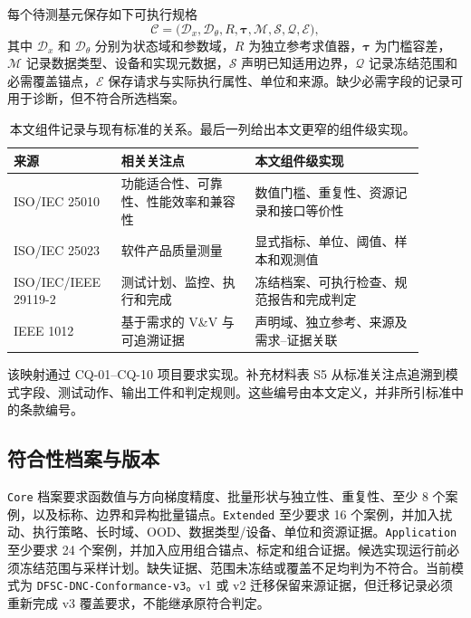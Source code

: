 \documentclass[preprint,12pt,authoryear]{elsarticle}
\begin{document}
每个待测基元保存如下可执行规格
\begin{equation}
 \mathcal{C}=\bigl(\mathcal{D}_{x},\mathcal{D}_{\theta},R,
 \boldsymbol{\tau},\mathcal{M},\mathcal{S},\mathcal{Q},\mathcal{E}\bigr),
\end{equation}
其中 $\mathcal{D}_{x}$ 和 $\mathcal{D}_{\theta}$ 分别为状态域和参数域，$R$ 为独立参考求值器，$\boldsymbol{\tau}$ 为门槛容差，$\mathcal{M}$ 记录数据类型、设备和实现元数据，$\mathcal{S}$ 声明已知适用边界，$\mathcal{Q}$ 记录冻结范围和必需覆盖锚点，$\mathcal{E}$ 保存请求与实际执行属性、单位和来源。缺少必需字段的记录可用于诊断，但不符合所选档案。

\begin{table}[t]
\centering
\small
\setlength{\tabcolsep}{4pt}
\caption{本文组件记录与现有标准的关系。最后一列给出本文更窄的组件级实现。}
\label{tab:standards-map-zh}
\begin{tabular}{>{\raggedright\arraybackslash}p{0.22\linewidth}>{\raggedright\arraybackslash}p{0.30\linewidth}>{\raggedright\arraybackslash}p{0.38\linewidth}}
\toprule
来源 & 相关关注点 & 本文组件级实现\\
\midrule
ISO/IEC 25010 & 功能适合性、可靠性、性能效率和兼容性 & 数值门槛、重复性、资源记录和接口等价性\\
ISO/IEC 25023 & 软件产品质量测量 & 显式指标、单位、阈值、样本和观测值\\
ISO/IEC/IEEE 29119-2 & 测试计划、监控、执行和完成 & 冻结档案、可执行检查、规范报告和完成判定\\
IEEE 1012 & 基于需求的 V\&V 与可追溯证据 & 声明域、独立参考、来源及需求--证据关联\\
\bottomrule
\end{tabular}
\end{table}

该映射通过 CQ-01--CQ-10 项目要求实现。补充材料表 S5 从标准关注点追溯到模式字段、测试动作、输出工件和判定规则。这些编号由本文定义，并非所引标准中的条款编号。

\subsection{符合性档案与版本}
\texttt{Core} 档案要求函数值与方向梯度精度、批量形状与独立性、重复性、至少 8 个案例，以及标称、边界和异构批量锚点。\texttt{Extended} 至少要求 16 个案例，并加入扰动、执行策略、长时域、OOD、数据类型/设备、单位和资源证据。\texttt{Application} 至少要求 24 个案例，并加入应用组合锚点、标定和组合证据。候选实现运行前必须冻结范围与采样计划。缺失证据、范围未冻结或覆盖不足均判为不符合。当前模式为 \texttt{DFSC-DNC-\allowbreak{}Conformance-v3}。v1 或 v2 迁移保留来源证据，但迁移记录必须重新完成 v3 覆盖要求，不能继承原符合判定。
\end{document}
